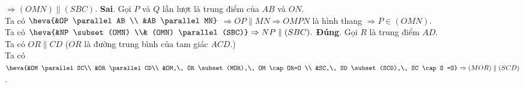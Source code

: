 \begin{ex}
{\begin{itemchoice}
  $\Rightarrow(OMN)  \parallel(SBC).$
  \itemch  \textbf{Sai}. Gọi $P$ và $Q$ lần lượt là trung điểm của $AB$ và $ON$. \\
   Ta có $\heva{&OP \parallel AB \\ &AB \parallel MN}$
  $\Rightarrow OP \parallel  MN \Rightarrow OMPN$ là hình thang $\Rightarrow P \in(OMN)$.\\
   Ta có $\heva{&NP \subset(OMN) \\& (OMN) \parallel(SBC)} \Rightarrow NP \parallel(SBC).$
  \itemch \textbf{Đúng}. Gọi $R$ là trung điểm  $AD$.\\
  Ta có $OR  \parallel CD$ ($OR$ là đường trung bình của tam giác $ACD$.)\\
  Ta có $\heva{&OM \parallel SC\\ &OR \parallel  CD\\ &OM,\, OR \subset(MOR),\, OM \cap OR=O \\ &SC,\, SD \subset(SCD),\, SC \cap S =S} \Rightarrow (MOR) \parallel(SCD)$.
 \end{itemchoice}
} 
\end{ex}

